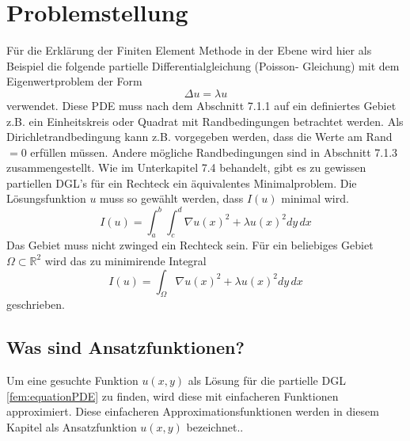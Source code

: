 %
%
%
\section{Problemstellung
\label{fem:section:problemstellung}}
Für die Erklärung der Finiten Element Methode in der Ebene wird hier als Beispiel die folgende partielle Differentialgleichung (Poisson- Gleichung) mit dem Eigenwertproblem der Form 
\begin{equation}
	\Delta u = \lambda u
	\label{fem:equationPDE}
\end{equation}
verwendet. Diese PDE muss nach dem Abschnitt 7.1.1 auf ein definiertes Gebiet z.B. ein Einheitskreis oder Quadrat mit Randbedingungen betrachtet werden. Als Dirichletrandbedingung kann z.B. vorgegeben werden, dass die Werte am Rand $= 0$ erfüllen müssen. Andere mögliche Randbedingungen sind in Abschnitt 7.1.3 zusammengestellt. Wie im Unterkapitel 7.4 behandelt, gibt es zu gewissen partiellen DGL's für ein Rechteck ein äquivalentes Minimalproblem. Die Lösungsfunktion $u$ muss so gewählt werden, dass $I(u)$ minimal wird.
\begin{equation}
	I(u) = \int_a^b \int_c^d \nabla u(x)^2 + \lambda u(x)^2 dy \, dx
	\label{fem:equationMinimalKapt7}
\end{equation}
Das Gebiet muss nicht zwinged ein Rechteck sein. Für ein beliebiges Gebiet $\Omega \subset \mathbb{R}^2$ wird das zu minimirende Integral  %
\begin{equation}
	I(u) = \int_{\Omega} \nabla u(x)^2 + \lambda u(x)^2 dy \, dx
	\label{fem:equationMinimalKapt7}
\end{equation}
geschrieben.
\subsection{Was sind Ansatzfunktionen?}
Um eine gesuchte Funktion $u(x,y)$ als Lösung für die partielle DGL \eqref{fem:equationPDE} zu finden, wird diese mit einfacheren Funktionen approximiert. Diese einfacheren Approximationsfunktionen werden in diesem Kapitel als Ansatzfunktion $u(x,y)$ bezeichnet..

